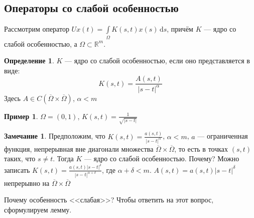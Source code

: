 \documentclass[11pt,openany,a4paper]{scrartcl}
\theoremstyle{plain}
\theoremstyle{definition}
\newtheorem{definition}[theorem]{Определение}
\newtheorem{remark}[theorem]{Замечание}
\newtheorem{example}[theorem]{Пример}
\newcommand\mb{\mathbb}
\newcommand\real{\mb R}
\newcommand{\dif}{\, \mathrm d}
\begin{document}
\subsection{Операторы со слабой особенностью}

Рассмотрим оператор $Ux(t) = \int\limits_\Omega K(s, t) x(s) \dif s$, причём $K$ —
ядро со слабой особенностью, а $\Omega \subset \real^m$.

\begin{definition}
    $K$ — ядро со слабой особенностью, если оно представляется в виде:
    $$
    K(s, t) = \frac{A(s, t)}{|s - t|^\alpha}
    $$
    Здесь $A \in C(\overline\Omega \times \overline\Omega)$, $\alpha < m$
\end{definition}
\begin{example}
    $\Omega = (0, 1)$, $K(s, t) = \frac{1}{\sqrt{|s - t|}}$
\end{example}
\begin{remark}
    Предположим, что $K(s, t) = \frac{a(s, t)}{|s - t|^\alpha}$, $\alpha < m$,
    $a$ — ограниченная функция, непрерывная вне диагонали множества
    $\overline\Omega \times \overline\Omega$, то есть в точках $(s, t)$ таких,
    что $s \neq t$. Тогда $K$ — ядро со слабой особенностью. Почему? Можно
    записать $K(s, t) = \frac{a(s, t)|s-t|^\delta}{|s-t|^{\alpha + \delta}}$, где
    $\alpha + \delta < m$. $A(s, t) = a(s, t)|s-t|^\delta$ непрерывно на
    $\overline\Omega \times \overline\Omega$
\end{remark}

Почему особенность <<слабая>>? Чтобы ответить на этот вопрос, сформулируем лемму.
\end{document}
